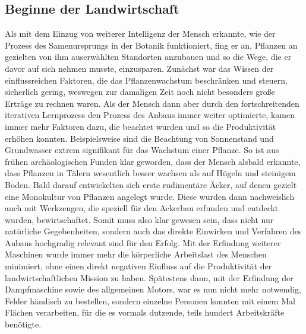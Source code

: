 \subsection{Beginne der Landwirtschaft}
Als mit dem Einzug von weiterer Intelligenz der Mensch erkannte, wie der Prozess des Samenursprungs in der Botanik funktioniert, fing er an, Pflanzen an gezielten von ihm auserwählten Standorten anzubauen und so die Wege, die er davor auf sich nehmen musste, einzusparen. Zunächst war das Wissen der einflussreichen Faktoren, die das Pflanzenwachstum beschränken und steuern, sicherlich gering, weswegen zur damaligen Zeit noch nicht besonders große Erträge zu rechnen waren. Als der Mensch dann aber durch den fortschreitenden iterativen Lernprozess den Prozess des Anbaus immer weiter optimierte, kamen immer mehr Faktoren dazu, die beachtet wurden und so die Produktivität erhöhen konnten. Beispielsweise sind die Beachtung von Sonnenstand und Grundwasser extrem signifikant für das Wachstum einer Pflanze. So ist aus frühen archäologischen Funden klar geworden, dass der Mensch alsbald erkannte, dass Pflanzen in Tälern wesentlich besser wachsen als auf Hügeln und steinigem Boden. Bald darauf entwickelten sich erste rudimentäre Äcker, auf denen gezielt eine Monokultur von Pflanzen angelegt wurde. Diese wurden dann nachweislich auch mit Werkzeugen, die speziell für den Ackerbau erfunden und entdeckt wurden, bewirtschaftet. Somit muss also klar gewesen sein, dass nicht nur natürliche Gegebenheiten, sondern auch das direkte Einwirken und Verfahren des Anbaus hochgradig relevant sind für den Erfolg. Mit der Erfindung weiterer Maschinen wurde immer mehr die körperliche Arbeitslast des Menschen minimiert, ohne einen direkt negativen Einfluss auf die Produktivität der landwirtschaftlichen Mission zu haben. Spätestens dann, mit der Erfindung der Dampfmaschine sowie des allgemeinen Motors, war es nun nicht mehr notwendig, Felder händisch zu bestellen, sondern einzelne Personen konnten mit einem Mal Flächen verarbeiten, für die es vormals dutzende, teils hundert Arbeitskräfte benötigte. \cite{inproceedings}
